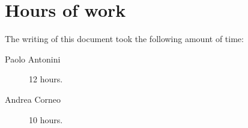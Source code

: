 \chapter{Hours of work}\label{chap:appendix}

The writing of this document took the following amount of time:

\begin{description}
	\item [Paolo Antonini] 12 hours.
	\item [Andrea Corneo] 10 hours.
\end{description}



